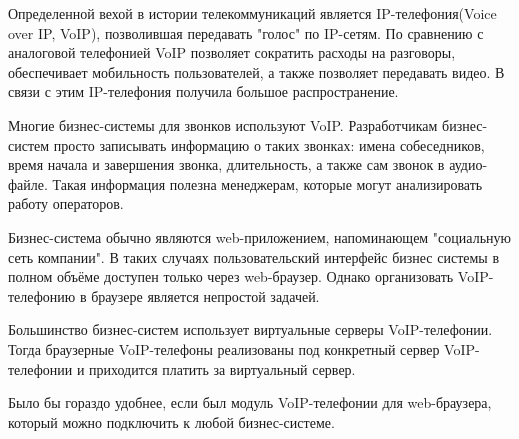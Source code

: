\intro
Определенной вехой в истории телекоммуникаций является IP-телефония(Voice over IP, VoIP), позволившая передавать "голос" по IP-сетям. По сравнению с аналоговой телефонией VoIP позволяет сократить расходы на разговоры, обеспечивает мобильность пользователей, а также позволяет передавать видео. В связи с этим IP-телефония получила большое распространение.

Многие бизнес-системы для звонков используют VoIP. Разработчикам бизнес-систем просто записывать информацию о таких звонках: имена собеседников, время начала и завершения звонка, длительность, а также сам звонок в аудио-файле. Такая информация полезна менеджерам, которые могут анализировать работу операторов.

Бизнес-система обычно являются web-приложением, напоминающем "социальную сеть компании". В таких случаях пользовательский интерфейс бизнес системы в полном объёме доступен только через web-браузер. Однако организовать VoIP-телефонию в браузере является непростой задачей.

Большинство бизнес-систем использует виртуальные серверы VoIP-телефонии. Тогда браузерные VoIP-телефоны реализованы под конкретный сервер VoIP-телефонии и приходится платить за виртуальный сервер.

Было бы гораздо удобнее, если был модуль VoIP-телефонии для web-браузера, который можно подключить к любой бизнес-системе.
